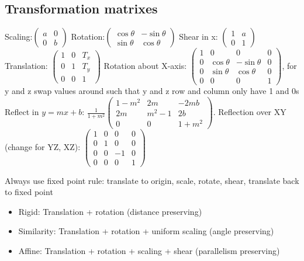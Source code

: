 \documentclass[a4paper]{article}
\begin{document}
\subsection{Transformation matrixes}
Scaling:$\left(
\begin{smallmatrix} a & 0\\
0 & b \end{smallmatrix}\right)$
Rotation:$\left(
\begin{smallmatrix}\cos \theta & -\sin \theta\\
\sin \theta & \cos \theta \end{smallmatrix}\right)$ 
Shear in x: $\left(\begin{smallmatrix} 1 & a\\ 0 & 1 \end{smallmatrix}\right)$
Translation: $\left(\begin{smallmatrix} 1 & 0 & T_x\\ 0 & 1 & T_y\\ 0 & 0 & 1 \end{smallmatrix}\right)$
Rotation about X-axis: $\left( \begin{smallmatrix} 1 & 0 & 0 & 0 \\ 0 & \cos \theta & -\sin \theta & 0 \\ 0 & \sin \theta & \cos \theta & 0 \\ 0 & 0 & 0 & 1 \end{smallmatrix} \right)$, for y and z swap values around such that y and z row and column only have 1 and 0s
Reflect in $y=mx+b$: $\frac{1}{1+m^2}\left(\begin{smallmatrix} 1-m^2 & 2m & -2mb \\ 2m & m^2 -1 & 2b \\ 0 & 0 & 1+m^2   \end{smallmatrix} \right)$. Reflection over XY (change for YZ, XZ): $\left(\begin{smallmatrix} 1 & 0 & 0 & 0\\ 0 & 1 & 0 & 0\\ 0 & 0 & -1 & 0 \\ 0 & 0 & 0 & 1 \end{smallmatrix}\right)$ 

Always use fixed point rule: translate to origin, scale, rotate, shear, translate back to fixed point

\begin{itemize}
	\item Rigid: Translation + rotation (distance preserving)
	\item Similarity: Translation + rotation + uniform scaling (angle preserving)
	\item Affine: Translation + rotation + scaling + shear (parallelism preserving)
\end{itemize}
\end{document}
